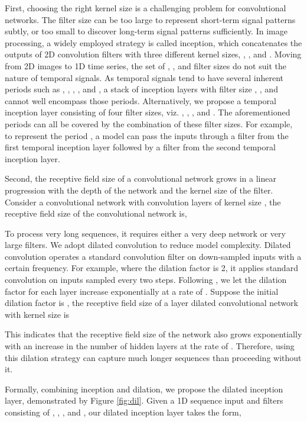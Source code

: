 \documentclass[sigconf]{acmart}
\begin{document}
First, choosing the right kernel size is a challenging problem for convolutional networks. The filter size can be too large to represent short-term signal patterns subtly, or too small to discover long-term signal patterns sufficiently.
In image processing, a widely employed strategy is called inception, which concatenates the outputs of 2D convolution filters with three different kernel sizes, , , and . Moving from 2D images to 1D time series, the set of , , and  filter sizes do not suit the nature of temporal signals. As temporal signals tend to have several inherent periods such as , , , , and , a stack of inception layers with filter size , , and  cannot well encompass those periods. Alternatively, we propose a temporal inception layer consisting of four filter sizes, viz. , , , and . The aforementioned periods can all be covered by the combination of these filter sizes. For example, to represent the period , a model can pass the inputs through a  filter from the first temporal inception layer followed by a  filter from the second temporal inception layer. 

Second, the receptive field size of a convolutional network grows in a linear progression with the depth of the network and the kernel size of the filter. Consider a convolutional network with   convolution layers of kernel size , the receptive field size of the convolutional network is, 

To process very long sequences, it requires either a very deep network or very large filters. We adopt dilated convolution to reduce model complexity. Dilated convolution operates a standard convolution filter on down-sampled inputs with a certain frequency.  For example, where the dilation factor is 2, it applies standard convolution on inputs sampled every two steps. 
Following \cite{oord2016wavenet}, we let the dilation factor for each layer increase exponentially at a rate of . Suppose the initial dilation factor is , the receptive field size of a  layer dilated convolutional network with kernel size  is 

This indicates that the receptive field size of the network also grows exponentially with an increase in the number of hidden layers at the rate of . Therefore, using this dilation strategy can capture much longer sequences than proceeding without it.

Formally, combining inception and dilation, we propose the dilated inception layer, demonstrated by Figure \ref{fig:dil}. Given a 1D sequence input  and filters consisting of , , , and , our dilated inception layer takes the form,
\end{document}
